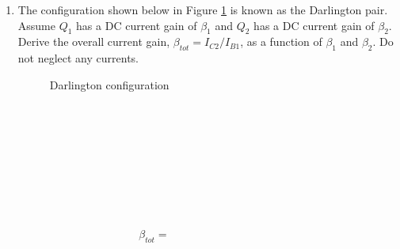 \documentclass{article}
\begin{document}
\begin{enumerate}
  
\item The configuration shown below in Figure \ref{darlington1} is known as the Darlington pair. Assume $Q_1$ has a DC current gain of $\beta_1$ and $Q_2$ has a DC current gain of $\beta_2$. Derive the overall current gain, $\beta_{tot} = I_{C2}/I_{B1}$, as a function of $\beta_1$ and $\beta_2$. Do not neglect any currents.
  
  \begin{figure}[!htb]
    
    \centerline{\box\graph}
    \caption{Darlington configuration}
    \label{darlington1}
  \end{figure}

  ~\\~\\~\\~\\~\\~\\~\\~\\

  \begin{align*}
    \boxed{\beta_{tot} = ~~~~~~~~~~~~~~~~~~~~~~~~~~~~~~~~~~~~~~~~~~~~}
  \end{align*}
  
\end{enumerate}
\end{document}
